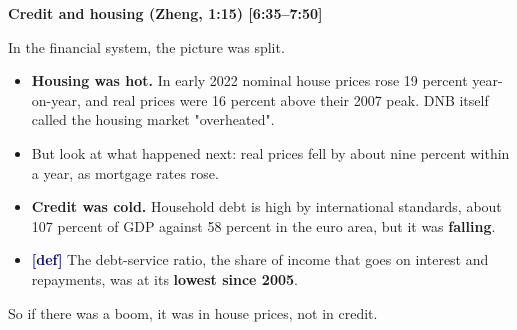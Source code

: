 {\small\textbf{Credit and housing (Zheng, 1:15) [6:35–7:50]}}\par\smallskip
In the financial system, the picture was split.
\begin{itemize}\setlength\itemsep{0pt}
\item \textbf{Housing was hot.} In early 2022 nominal house prices rose 19 percent year-on-year, and real prices were 16 percent above their 2007 peak. DNB itself called the housing market "overheated".
\item But look at what happened next: real prices fell by about nine percent within a year, as mortgage rates rose.
\item \textbf{Credit was cold.} Household debt is high by international standards, about 107 percent of GDP against 58 percent in the euro area, but it was \textbf{falling}.
\item \textcolor{navy}{\textbf{[def]}} The debt-service ratio, the share of income that goes on interest and repayments, was at its \textbf{lowest since 2005}.
\end{itemize}
\par\smallskip
So if there was a boom, it was in house prices, not in credit.
